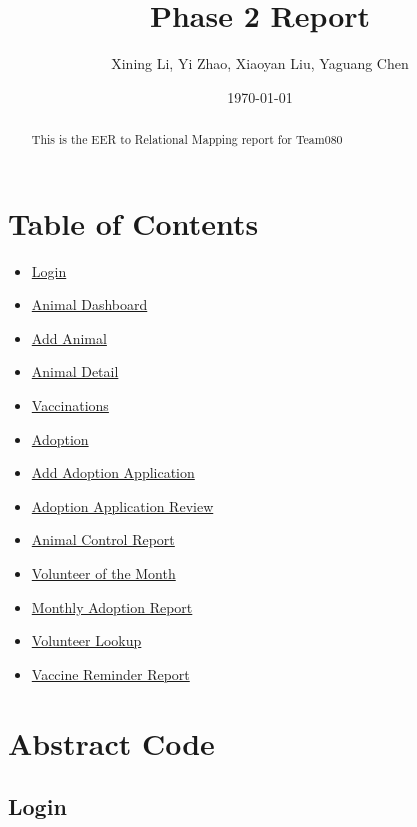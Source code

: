 \documentclass[a4paper]{article}
\begin{document}
\title{\textbf{\huge{Phase 2 Report}}}
\author{\textbf\large{Xining Li, Yi Zhao, Xiaoyan Liu, Yaguang Chen}}
\date{\today}
\maketitle
\begin{abstract}
This is the EER to Relational Mapping report for Team080
\end{abstract}\maketitle
\section{Table of Contents}

	\begin{itemize}
		\item \hyperlink{login}{Login}
		\item \hyperlink{animal_dashboard}{Animal Dashboard}
		\item \hyperlink{add_animal}{Add Animal}
		\item \hyperlink{animal_detail}{Animal Detail}
		\item \hyperlink{vaccinations}{Vaccinations}
		\item \hyperlink{adoption}{Adoption}
		\item \hyperlink{add_adoption_app}{Add Adoption Application}
		\item \hyperlink{adoption_app_review}{Adoption Application Review}
		\item \hyperlink{animal_control_report}{Animal Control Report}
		\item \hyperlink{volunteer_of_the_month}{Volunteer of the Month}
		\item \hyperlink{monthly_adoption_report}{Monthly Adoption Report}
		\item \hyperlink{volunteer_lookup}{Volunteer Lookup}
		\item \hyperlink{vaccine_reminder_report}{Vaccine Reminder Report}
	\end{itemize}


\pagebreak

\section{Abstract Code}
\hypertarget{login}{\subsection{Login}}
\end{document}
